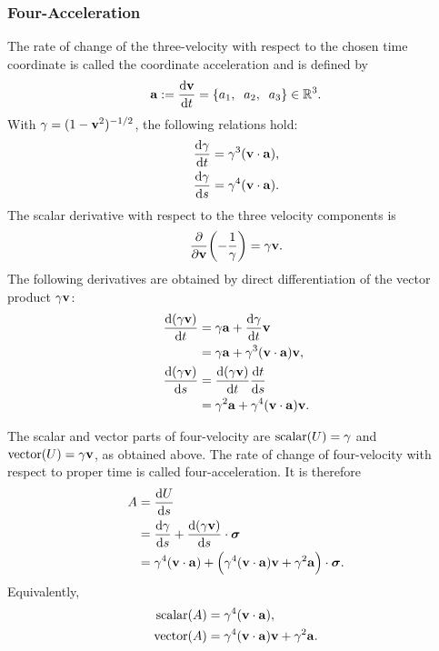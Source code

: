 \subsubsection{Four-Acceleration}
The rate of change of the three-velocity with respect to the chosen time
coordinate is called the coordinate acceleration and is defined by
\begin{equation*}
\mathbf{a}:=\frac{\mathrm d\mathbf{v}}{\mathrm d t}
=\left\{a_1,\mkern10mu a_2,\mkern10mu a_3\right\}\in\mathbb{R}^3.
\end{equation*}
With \(\gamma=(1-\mathbf{v}^2)^{-1/2}\), the following relations hold:
\begin{align*}
\frac{\mathrm d\gamma}{\mathrm d t}&=\gamma^3(\mathbf{v}\cdot\mathbf{a}),\\
\frac{\mathrm d\gamma}{\mathrm d s}&=\gamma^4(\mathbf{v}\cdot\mathbf{a}).
\end{align*}
The scalar derivative with respect to the three velocity components is
\[
\frac{\partial}{\partial\mathbf{v}}\!\left(-\frac{1}{\gamma}\right)
=\gamma\mathbf{v}.
\]
The following derivatives are obtained by direct differentiation of the vector product \(\gamma\mathbf{v}\):
\begin{align*}
\frac{\mathrm d(\gamma\mathbf{v})}{\mathrm d t}
&=\gamma\mathbf{a}+\frac{\mathrm d\gamma}{\mathrm d t}\mathbf{v}\notag\\
&=\gamma\mathbf{a}+\gamma^3(\mathbf{v}\cdot\mathbf{a})\mathbf{v},\\
\frac{\mathrm d(\gamma\mathbf{v})}{\mathrm d s}
&=\frac{\mathrm d(\gamma\mathbf{v})}{\mathrm d t}\frac{\mathrm d t}{\mathrm d s}\notag\\
&=\gamma^2\mathbf{a}+\gamma^4(\mathbf{v}\cdot\mathbf{a})\mathbf{v}.
\end{align*}

The scalar and vector parts of four-velocity are
\(\operatorname{scalar}(U)=\gamma\) and
\(\operatorname{vector}(U)=\gamma\mathbf{v}\), as obtained above.
The rate of change of four-velocity with respect to proper time is called
four-acceleration. It is therefore
\begin{align*}
A
&=\frac{\mathrm dU}{\mathrm d s}\notag\\
&=\frac{\mathrm d\gamma}{\mathrm d s}+\frac{\mathrm d(\gamma\mathbf{v})}{\mathrm d s}\cdot\mathbf{\bm{\sigma}}\notag\\
&=\gamma^4(\mathbf{v}\cdot\mathbf{a})
+\Bigl(\gamma^4(\mathbf{v}\cdot\mathbf{a})\mathbf{v}+\gamma^2\mathbf{a}\Bigr)\cdot\mathbf{\bm{\sigma}}.
\end{align*}
Equivalently,
\begin{align*}
\operatorname{scalar}(A)
&=\gamma^4(\mathbf{v}\cdot\mathbf{a}),\\
\operatorname{vector}(A)
&=\gamma^4(\mathbf{v}\cdot\mathbf{a})\mathbf{v}+\gamma^2\mathbf{a}.
\end{align*}

